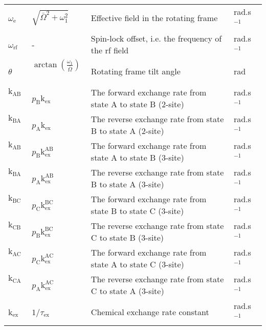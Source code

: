 \documentclass[a4paper,11pt,twoside,openright]{book}
\begin{document}
{\begin{landscape}
\begin{center}
\begin{small}
\begin{longtable}{llll}
$\omega_\textrm{e}$\           & $\sqrt{\bar\Omega ^2 + \omega_1 ^2}$\   & Effective field in the rotating frame                                   & rad.s$^{-1}$\  \\
$\omega_\textrm{rf}$\          & -                              & Spin-lock offset, i.e. the frequency of the rf field                          & rad.s$^{-1}$\  \\
$\theta$\            & $\arctan \left( \frac{\omega_1 }{\bar\Omega } \right)$\   & Rotating frame tilt angle                             & rad \\
$\textrm{k}_\textrm{AB}$\              & $p_\textrm{B}\textrm{k}_\textrm{ex}$\                       & The forward exchange rate from state A to state B (2-site)                    & rad.s$^{-1}$\  \\
$\textrm{k}_\textrm{BA}$\              & $p_\textrm{A}\textrm{k}_\textrm{ex}$\                       & The reverse exchange rate from state B to state A (2-site)                    & rad.s$^{-1}$\  \\
$\textrm{k}_\textrm{AB}$\              & $p_\textrm{B}\textrm{k}_\textrm{ex}^\textrm{AB}$\                     & The forward exchange rate from state A to state B (3-site)                    & rad.s$^{-1}$\  \\
$\textrm{k}_\textrm{BA}$\              & $p_\textrm{A}\textrm{k}_\textrm{ex}^\textrm{AB}$\                     & The reverse exchange rate from state B to state A (3-site)                    & rad.s$^{-1}$\  \\
$\textrm{k}_\textrm{BC}$\              & $p_\textrm{C}\textrm{k}_\textrm{ex}^\textrm{BC}$\                     & The forward exchange rate from state B to state C (3-site)                    & rad.s$^{-1}$\  \\
$\textrm{k}_\textrm{CB}$\              & $p_\textrm{B}\textrm{k}_\textrm{ex}^\textrm{BC}$\                     & The reverse exchange rate from state C to state B (3-site)                    & rad.s$^{-1}$\  \\
$\textrm{k}_\textrm{AC}$\              & $p_\textrm{C}\textrm{k}_\textrm{ex}^\textrm{AC}$\                     & The forward exchange rate from state A to state C (3-site)                    & rad.s$^{-1}$\  \\
$\textrm{k}_\textrm{CA}$\              & $p_\textrm{A}\textrm{k}_\textrm{ex}^\textrm{AC}$\                     & The reverse exchange rate from state C to state A (3-site)                    & rad.s$^{-1}$\  \\
$\textrm{k}_\textrm{ex}$\              & $1 / \tau_\textrm{ex}$\                      & Chemical exchange rate constant                                               & rad.s$^{-1}$\  \\

\end{longtable}
\end{small}
\end{center}
\end{landscape}}
\end{document}
